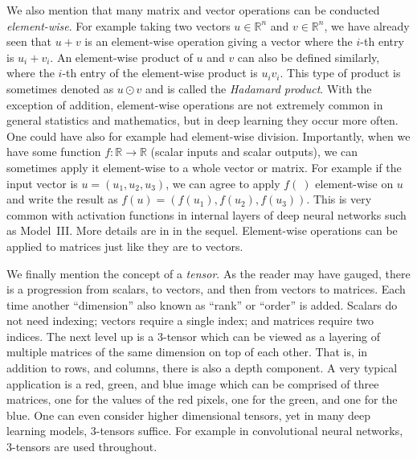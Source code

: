 We also mention that many matrix and vector operations can be conducted {\em element-wise}. For example taking two vectors $u \in {\mathbb R}^n$ and $v \in {\mathbb R}^n$, we have already seen that $u+v$ is an element-wise operation giving a vector where the $i$-th entry is $u_i+v_i$. An element-wise product of $u$ and $v$ can also be defined similarly, where the $i$-th entry of the element-wise product is $u_i v_i$. This type of product is sometimes denoted as $u \odot v$ and is called the {\em Hadamard product}. With the exception of addition, element-wise operations are not extremely common in general statistics and mathematics, but in deep learning they occur more often. One could have also for example had element-wise division. Importantly, when we have some function $f: {\mathbb R} \to {\mathbb R}$ (scalar inputs and scalar outputs), we can sometimes apply it element-wise to a whole vector or matrix. For example if the input vector is $u = (u_1, u_2, u_3)$, we can agree to apply $f(~)$ element-wise on $u$ and write the result as $f(u) = (f(u_1), f(u_2), f(u_3))$. This is very common with activation functions in internal layers of deep neural networks such as Model~III. More details are in in the sequel. Element-wise operations can be applied to matrices just like they are to vectors.

We finally mention the concept of a {\em tensor}. As the reader may have gauged, there is a progression from scalars, to vectors, and then from vectors to matrices. Each time another ``dimension'' also known as ``rank'' or ``order'' is added. Scalars do not need indexing; vectors require a single index; and matrices require two indices. The next level up is a $3$-tensor which can be viewed as a layering of multiple matrices of the same dimension on top of each other. That is, in addition to rows, and columns, there is also a depth component. A very typical application is a red, green, and blue image which can be comprised of three matrices, one for the values of the red pixels, one for the green, and one for the blue. One can even consider higher dimensional tensors, yet in many deep learning models, $3$-tensors suffice. For example in convolutional neural networks, $3$-tensors are used throughout.

